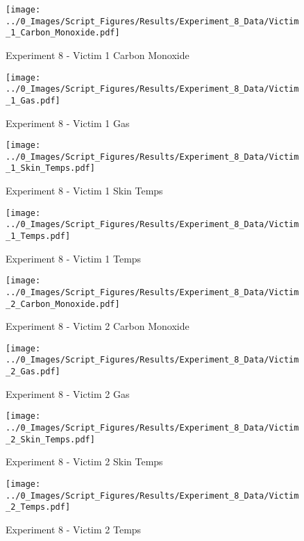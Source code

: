 	\clearpage

	\begin{figure}[H]
		\centering
		\texttt{[image: ../0\_Images/Script\_Figures/Results/Experiment\_8\_Data/Victim\_1\_Carbon\_Monoxide.pdf]}
		\caption[]{Experiment 8 - Victim 1 Carbon Monoxide}
	\end{figure}
 

	\begin{figure}[H]
		\centering
		\texttt{[image: ../0\_Images/Script\_Figures/Results/Experiment\_8\_Data/Victim\_1\_Gas.pdf]}
		\caption[]{Experiment 8 - Victim 1 Gas}
	\end{figure}
 
	\clearpage

	\begin{figure}[H]
		\centering
		\texttt{[image: ../0\_Images/Script\_Figures/Results/Experiment\_8\_Data/Victim\_1\_Skin\_Temps.pdf]}
		\caption[]{Experiment 8 - Victim 1 Skin Temps}
	\end{figure}
 

	\begin{figure}[H]
		\centering
		\texttt{[image: ../0\_Images/Script\_Figures/Results/Experiment\_8\_Data/Victim\_1\_Temps.pdf]}
		\caption[]{Experiment 8 - Victim 1 Temps}
	\end{figure}
 
	\clearpage

	\begin{figure}[H]
		\centering
		\texttt{[image: ../0\_Images/Script\_Figures/Results/Experiment\_8\_Data/Victim\_2\_Carbon\_Monoxide.pdf]}
		\caption[]{Experiment 8 - Victim 2 Carbon Monoxide}
	\end{figure}
 

	\begin{figure}[H]
		\centering
		\texttt{[image: ../0\_Images/Script\_Figures/Results/Experiment\_8\_Data/Victim\_2\_Gas.pdf]}
		\caption[]{Experiment 8 - Victim 2 Gas}
	\end{figure}
 
	\clearpage

	\begin{figure}[H]
		\centering
		\texttt{[image: ../0\_Images/Script\_Figures/Results/Experiment\_8\_Data/Victim\_2\_Skin\_Temps.pdf]}
		\caption[]{Experiment 8 - Victim 2 Skin Temps}
	\end{figure}
 

	\begin{figure}[H]
		\centering
		\texttt{[image: ../0\_Images/Script\_Figures/Results/Experiment\_8\_Data/Victim\_2\_Temps.pdf]}
		\caption[]{Experiment 8 - Victim 2 Temps}
	\end{figure}
 
